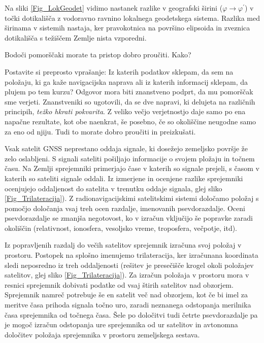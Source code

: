 Na sliki \ref{Fig_LokGeodet} vidimo nastanek razlike v geografski širini ($\varphi \rightarrow \varphi^\prime$) v točki dotikališča z vodoravno ravnino lokalnega geodetskega sistema. Razlika med širinama v sistemih nastaja, ker pravokotnica na površino elipsoida in zveznica dotikališča s težiščem Zemlje nista vzporedni.


Bodoči pomorščaki morate ta pristop dobro proučiti. Kako? 

Postavite si preprosto vprašanje: Iz katerih podatkov sklepam, da sem na položaju, ki ga kaže navigacijska naprava ali iz katerih informacij sklepam, da plujem po tem kurzu? Odgovor mora biti znanstveno podprt, da mu pomorščak sme verjeti. Znanstveniki so ugotovili, da se dve napravi, ki delujeta na različnih principih, \textit{težko hkrati pokvarita}. Z veliko večjo verjetnostjo daje samo po ena napačne rezultate, kot obe naenkrat, še posebno, če so okoliščine neugodne samo za eno od njiju. Tudi to morate dobro proučiti in preizkušati.




Vsak satelit GNSS neprestano oddaja signale, ki dosežejo zemeljsko površje že zelo oslabljeni. S signali sateliti pošiljajo informacije o svojem pložaju in točnem času. Na Zemlji sprejemniki primerjajo čase v katerih so signale prejeli, s časom v katerih so sateliti signale oddali. Iz izmerjene in ocenjene razlike sprejemniki ocenjujejo oddaljenost do satelita v trenutku oddaje signala, glej sliko \ref{Fig_Trilateracija}). Z radionavigacijskimi satelitskimi sistemi določamo položaj s pomočjo določanja vsaj treh ocen razdalje, imenovanih psevdorazdalje. Oceni psevdorazdalje se zmanjša negotovost, ko v izračun vključijo še popravke zaradi okoliščin (relativnost, ionosfera, vesoljsko vreme, troposfera, večpotje, itd). 

Iz popravljenih razdalj do večih satelitov sprejemnik izračuna svoj položaj v prostoru. Postopek na splošno imenujemo trilateracija, ker izračunana koordinata sledi neposredno iz treh oddaljenosti (rešitev je presečišče krogel okoli položajev satelitov, glej sliko \ref{Fig_Trilateracija}). 
Za izračun položaja v prostoru mora v resnici sprejemnik dobivati podatke od vsaj štirih satelitov nad obzorjem. Sprejemnik namreč potrebuje še en satelit več nad obzorjem, kot če bi imel za meritve časa prihoda signala točno uro, zaradi neznanega odstopanja merilnika časa sprejemnika od točnega časa. Šele po določitvi tudi četrte psevdorazdalje pa je mogoč izračun odstopanja ure sprejemnika od ur satelitov in avtonomna določitev položaja sprejemnika v prostoru zemeljskega sestava.



